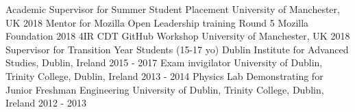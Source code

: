 \begin{cvpress}
   \cvpres
   {Academic Supervisor for Summer Student Placement}
    {University of Manchester, UK}
    {2018}
   \cvpres
   {Mentor for Mozilla Open Leadership training Round 5}
    {Mozilla Foundation}
    {2018}
   \cvpres
   {4IR CDT GitHub Workshop}
    {University of Manchester, UK}
    {2018}
   \cvpres
   {Supervisor for Transition Year Students (15-17 yo)}
   {Dublin Institute for Advanced Studies, Dublin, Ireland}
   {2015 - 2017}
   \cvpres
   {Exam invigilator}
   {University of Dublin, Trinity College, Dublin, Ireland}
   {2013 - 2014}
   \cvpres
   {Physics Lab Demonstrating for Junior Freshman Engineering}
   {University of Dublin, Trinity College, Dublin, Ireland}
   {2012 - 2013}
\end{cvpress}


